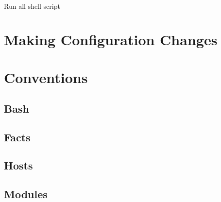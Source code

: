 \documentclass[oneside]{book}
\begin{document}
Run all shell script

\chapter{Making Configuration Changes}

\chapter{Conventions}
\section{Bash}

\section{Facts}

\section{Hosts}

\section{Modules}
\end{document}
